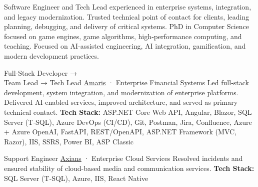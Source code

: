 \documentclass[
	a4paper,
]{fortysecondscv}
\begin{document}
\makefrontsidebar

Software Engineer and Tech Lead experienced in enterprise systems, integration, and legacy modernization. Trusted technical point of contact for clients, leading planning, debugging, and delivery of critical systems. PhD in Computer Science focused on game engines, game algorithms, high‑performance computing, and teaching. Focused on AI-assisted engineering, AI integration, gamification, and modern development practices.

\begin{cvtable}[3]

        {Full-Stack Developer → \\Team Lead → Tech Lead\vspace{0.3em}}
        {\textcolor{cvsectioncolor}{\href{https://amaris.com/}{Amaris}} · Enterprise Financial Systems}
        {
         Led full‑stack development, system integration, and modernization of enterprise platforms. 
         Delivered AI‑enabled services, improved architecture, and served as primary technical contact.
         \newline \textbf{Tech Stack:} 
         {\color{skgreen}ASP.NET Core Web API},
         {\color{skgreen}Angular}, 
         {\color{sklimegreen}Blazor},
         {\color{sklimegreen}SQL Server (T‑SQL)}, 
         {\color{sklimegreen}Azure DevOps (CI/CD)}, 
         {\color{sklimegreen}Git}, 
         {\color{sklimegreen}Postman},
         {\color{sklimegreen}Jira},
         {\color{sklimegreen}Confluence},
         {\color{skyellow}Azure + Azure OpenAI},
         {\color{skyellow}FastAPI, REST/OpenAPI}, 
         {\color{skyellow}ASP.NET Framework (MVC, Razor)},
         {\color{skyellow}IIS},
         {\color{skyellow}SSRS, Power BI},
         {\color{skorange}ASP Classic}}

        {Support Engineer}
        {\textcolor{cvsectioncolor}{\href{https://www.axians.pt/}{Axians}} · Enterprise Cloud Services}
        {Resolved incidents and ensured stability of cloud-based media and communication services.
         \newline \textbf{Tech Stack:} 
         {\color{sklimegreen}SQL Server (T‑SQL)},
         {\color{skyellow}Azure},
         {\color{skyellow}IIS},
         {\color{skorange}React Native}}


\end{cvtable}
\end{document}
